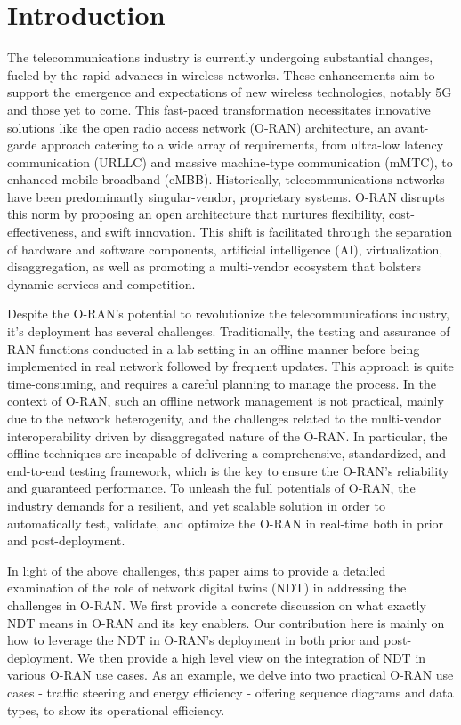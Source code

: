 \documentclass[]{IEEEtran}
\begin{document}
\section{Introduction}  \label{sec:Intro}

The telecommunications industry is currently undergoing substantial changes, fueled by the rapid advances in wireless networks. These enhancements aim to support the emergence and expectations of new wireless technologies, notably 5G and those yet to come. This fast-paced transformation necessitates innovative solutions like the open radio access network (O-RAN) architecture, an avant-garde approach catering to a wide array of requirements, from ultra-low latency communication (URLLC) and massive machine-type communication (mMTC), to enhanced mobile broadband (eMBB). Historically, telecommunications networks have been predominantly singular-vendor, proprietary systems. O-RAN disrupts this norm by proposing an open architecture that nurtures flexibility, cost-effectiveness, and swift innovation. This shift is facilitated through the separation of hardware and software components, artificial intelligence (AI), virtualization, disaggregation, as well as promoting a multi-vendor ecosystem that bolsters dynamic services and competition.

Despite the O-RAN's potential to revolutionize the telecommunications industry, it's deployment has several challenges. Traditionally, the testing and assurance of RAN functions conducted in a lab setting in an offline manner before being implemented in real network followed by frequent updates. This approach is quite time-consuming, and requires a careful planning to manage the process. In the context of O-RAN, such an offline network management is not practical, mainly due to the network heterogenity, and the challenges related to the multi-vendor interoperability driven by disaggregated nature of the O-RAN. In particular, the offline techniques are incapable of delivering a comprehensive, standardized, and end-to-end testing framework, which is the key to ensure the O-RAN's reliability and guaranteed performance. To unleash the full potentials of O-RAN, the industry demands for a resilient, and yet scalable solution in order to automatically test, validate, and optimize the O-RAN in real-time both in prior and post-deployment.

In light of the above challenges, this paper aims to provide a detailed examination of the role of network digital twins (NDT) in addressing the challenges in O-RAN. We first provide a concrete discussion on what exactly NDT means in O-RAN and its key enablers. Our contribution here is mainly on how to leverage the NDT in O-RAN's deployment in both prior and post-deployment. We then provide a high level view on the integration of NDT in various O-RAN use cases. As an example, we delve into two practical O-RAN use cases - traffic steering and energy efficiency - offering sequence diagrams and data types, to show its operational efficiency.
\end{document}
